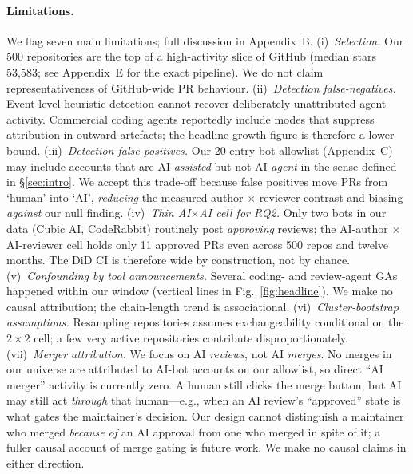 \documentclass{article}
\begin{document}
\paragraph{Limitations.} We flag seven main limitations; full discussion in Appendix~B.
(i)~\emph{Selection.} Our 500 repositories are the top of a high-activity slice of GitHub (median stars 53{,}583; see Appendix~E for the exact pipeline). We do not claim representativeness of GitHub-wide PR behaviour.
(ii)~\emph{Detection false-negatives.} Event-level heuristic detection cannot recover deliberately unattributed agent activity. Commercial coding agents reportedly include modes that suppress attribution in outward artefacts; the headline growth figure is therefore a lower bound.
(iii)~\emph{Detection false-positives.} Our 20-entry bot allowlist (Appendix~C) may include accounts that are AI-\emph{assisted} but not AI-\emph{agent} in the sense defined in §\ref{sec:intro}. We accept this trade-off because false positives move PRs from `human' into `AI', \emph{reducing} the measured author-$\times$-reviewer contrast and biasing \emph{against} our null finding.
(iv)~\emph{Thin AI$\times$AI cell for RQ2.} Only two bots in our data (Cubic AI, CodeRabbit) routinely post \emph{approving} reviews; the AI-author $\times$ AI-reviewer cell holds only 11{} approved PRs even across 500 repos and twelve months. The DiD CI is therefore wide by construction, not by chance.
(v)~\emph{Confounding by tool announcements.} Several coding- and review-agent GAs happened within our window (vertical lines in Fig.~\ref{fig:headline}). We make no causal attribution; the chain-length trend is associational.
(vi)~\emph{Cluster-bootstrap assumptions.} Resampling repositories assumes exchangeability conditional on the $2\times 2$ cell; a few very active repositories contribute disproportionately.
(vii)~\emph{Merger attribution.} We focus on AI \emph{reviews}, not AI \emph{merges}. No merges in our universe are attributed to AI-bot accounts on our allowlist, so direct ``AI merger'' activity is currently zero. A human still clicks the merge button, but AI may still act \emph{through} that human---e.g., when an AI review's ``approved'' state is what gates the maintainer's decision. Our design cannot distinguish a maintainer who merged \emph{because of} an AI approval from one who merged in spite of it; a fuller causal account of merge gating is future work.
We make no causal claims in either direction.



\end{document}
